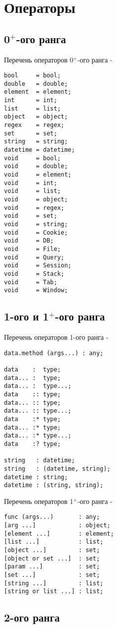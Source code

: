 \section{Операторы}

\subsection{0$^+$-ого ранга}

\noindent Перечень операторов 0$^+$-ого ранга -
\begin{lstlisting}[numbers=none]
bool     = bool;
double   = double;
element  = element;
int      = int;
list     = list;
object   = object;
regex    = regex;
set      = set;
string   = string;
datetime = datetime;
void     = bool;
void     = double;
void     = element;
void     = int;
void     = list;
void     = object;
void     = regex;
void     = set;
void     = string;
void     = Cookie;
void     = DB;
void     = File;
void     = Query;
void     = Session;
void     = Stack;
void     = Tab;
void     = Window;
\end{lstlisting}

\subsection{1-ого и 1$^+$-ого ранга}
\noindent Перечень операторов 1-ого ранга -
\begin{lstlisting}[numbers=none]
data.method (args...) : any;

data    :  type;
data... :  type;
data... :  type...;
data    :: type;
data... :: type;
data... :: type...;
data    :* type;
data... :* type;
data... :* type...;
data    :? type;

string   : datetime;
string   : (datetime, string);
datetime : string;
datetime : (string, string);
\end{lstlisting}

\noindent Перечень операторов 1$^+$-ого ранга -
\begin{lstlisting}[numbers=none]
func (args...)       : any;
[arg ...]            : object;
[element ...]        : element;
[list ...]           : list;
[object ...]         : set;
[object or set ...]  : set;
[param ...]          : set;
[set ...]            : set;
[string ...]         : list;
[string or list ...] : list;
\end{lstlisting}

\subsection{2-ого ранга}

